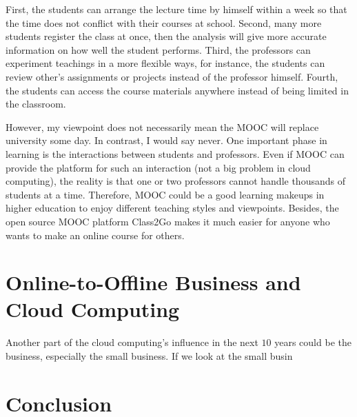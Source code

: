 First, the students can arrange the lecture time by himself within a week so that the time does not conflict with their courses at school. Second, many more students register the class at once, then the analysis will give more accurate information on how well the student performs. Third, the professors can experiment teachings in a more flexible ways, for instance, the students can review other's assignments or projects instead of the professor himself. Fourth, the students can access the course materials anywhere instead of being limited in the classroom.

However, my viewpoint does not necessarily mean the MOOC will replace university some day. In contrast, I would say never. One important phase in learning is the interactions between students and professors. Even if MOOC can provide the platform for such an interaction (not a big problem in cloud computing), the reality is that one or two professors cannot handle thousands of students at a time. Therefore, MOOC could be a good learning makeups in higher education to enjoy different teaching styles and viewpoints. Besides, the open source MOOC platform Class2Go\cite{class2go} makes it much easier for anyone who wants to make an online course for others.

\section{Online-to-Offline Business and Cloud Computing}
Another part of the cloud computing's influence in the next $10$ years could be the business, especially the small business. If we look at the small busin

\section{Conclusion}
